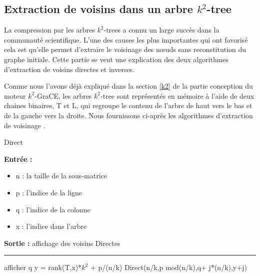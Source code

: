 \documentclass[a4paper,oneside,12pt]{report}
\theoremstyle{definition}
\begin{document}
\pagestyle{plain}
\newpage

\begin{appendix}


\chapter{Extraction de voisins dans un arbre $k^2$-tree}
    \label{k2_annexe}
La compression par les arbres $k^2$-trees a connu un large succès dans la communauté scientifique. L'une des causes les plus importantes qui ont favorisé cela est qu'elle permet d'extraire le voisinage des nœuds sans reconstitution du graphe initiale. Cette partie se veut une explication des deux algorithmes d'extraction de voisins directes et inverses. 

Comme nous l'avons déjà expliqué dans la section \ref{k2} de la partie conception   du moteur $k^2$-GraCE, les arbres $k^2$-tree sont représentés en mémoire à l'aide de deux chaines binaires, T et L, qui regroupe le contenu de l'arbre de haut vers le bas et de la gauche vers la droite. Nous fournissons ci-après les algorithmes d'extraction de voisinage \citep{brisaboa2009k}.



\begin{multicols}{2}

\begin{algorithm}[H]
					\label{alg:Direct}
					\caption{Direct}
					\textbf{Entrée :}
						\begin{itemize}[label=$\bullet$]
							\item n : la taille de la sous-matrice
							\item p : l'indice de la ligne 
							\item q : l'indice de la colonne
							\item x : l'indice dans l'arbre
						\end{itemize}
					\textbf{Sortie :} affichage des voisins Directes\\							\noindent\rule{\textwidth}{1pt}
						
						
				\begin{algorithmic} [1]
							\STATE afficher q
						\ENDIF
					\ELSE
							\STATE y = rank(T,x)*$k^2$ + p/(n/k)
								\STATE Direct(n/k,p mod(n/k),q+ j*(n/k),y+j)
							\ENDFOR
						\ENDIF
					\ENDIF 
					
					
				\end{algorithmic}
			\end{algorithm}



\end{multicols}
\end{appendix}
\end{document}
